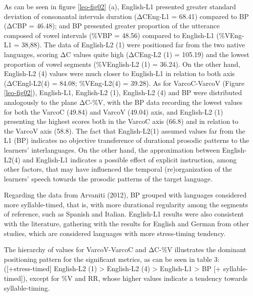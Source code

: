 As can be seen in figure \ref{leo-fig02} (a), English-L1 presented greater standard deviation
of consonantal intervals duration (ΔCEng-L1 = 68.41) compared to BP (ΔCBP =
46.48); and BP presented greater proportion of the utterance composed of vowel
intervals (\%VBP = 48.56) compared to English-L1 (\%VEng-L1 = 38,88). The data
of English-L2 (1) were positioned far from the two native languages, scoring ΔC
values quite high (ΔCEng-L2 (1) = 105.19) and the lowest proportion of vowel
segments (\%VEnglish-L2 (1) = 36.24). On the other hand, English-L2 (4) values
were much closer to English-L1 in relation to both axis (ΔCEngl-L2(4) = 84.08;
\%VEng-L2(4) = 39.28). As for VarcoC-VarcoV (Figure \ref{leo-fig02}),
English-L1, English-L2 (1), English-L2 (4) and BP were distributed analogously
to the plane ΔC-\%V, with the BP data recording the lowest values for both the
VarcoC (49.84) and VarcoV (49.04) axis, and English-L2 (1) presenting the
highest scores both in the VarcoC axis (66.8) and in relation to the VarcoV
axis (58.8). The fact that English-L2(1) assumed values far from the L1 (BP)
indicates no objective transference of durational prosodic patterns to the
learners’ interlanguages. On the other hand, the approximation between
English-L2(4) and English-L1 indicates a possible effect of explicit
instruction, among other factors, that may have influenced the temporal
(re)organization of the learners’ speech towards the prosodic patterns of the
target language. 

Regarding the data from Arvaniti (2012), BP grouped with languages considered
more syllable-timed, that is, with more durational regularity among the
segments of reference, such as Spanish and Italian. English-L1 results were
also consistent with the literature, gathering with the results for English and
German from other studies, which are considered languages with more
stress-timing tendency. 

The hierarchy of values for VarcoV-VarcoC and ΔC-\%V illustrates the dominant
positioning pattern for the significant metrics, as can be seen in table 3:
([+stress-timed] English-L2 (1) > English-L2 (4) > English-L1 > BP [+
syllable-timed]), except for \%V and RR, whose higher values indicate a
tendency towards syllable-timing.


